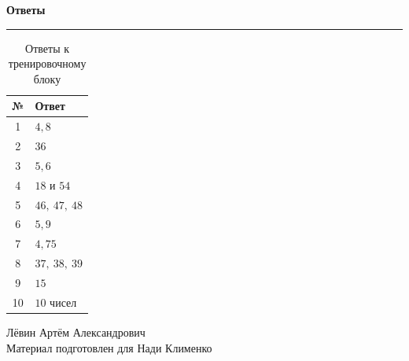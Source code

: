 \documentclass[a4paper,12pt]{article}
\begin{document}
\newpage
\thispagestyle{fancy}

\begin{center}
    {\LARGE\bfseries\color{darkaccent}Ответы}
\end{center}

\vspace{0.5em}
{\color{accent}\rule{\linewidth}{0.8pt}}

\vspace{0.8em}

\renewcommand{\arraystretch}{1.4}

\begin{table}[ht]
\centering
\caption{Ответы к тренировочному блоку}
\begin{tabularx}{\linewidth}{@{}cX@{}}
\toprule
\textbf{№} & \textbf{Ответ} \\
\midrule
1 & \(4{,}8\) \\
2 & \(36\) \\
3 & \(5{,}6\) \\
4 & \(18\) и \(54\) \\
5 & \(46,\ 47,\ 48\) \\
6 & \(5{,}9\) \\
7 & \(4{,}75\) \\
8 & \(37,\ 38,\ 39\) \\
9 & \(15\) \\
10 & \(10\) чисел \\
\bottomrule
\end{tabularx}
\end{table}

\vfill

\begin{center}
{\small\color{textgray}
Лёвин Артём Александрович\\
Материал подготовлен для Нади Клименко}
\end{center}
\end{document}
